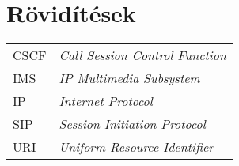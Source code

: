 

\section*{Rövidítések}
\label{sec:roviditesek}

\begin{tabular}{p{2cm}l}
CSCF & \emph{Call Session Control Function} \\
IMS & \emph{IP Multimedia Subsystem} \\
IP & \emph{Internet Protocol} \\
SIP & \emph{Session Initiation Protocol} \\
URI & \emph{Uniform Resource Identifier} \\
\end{tabular}

